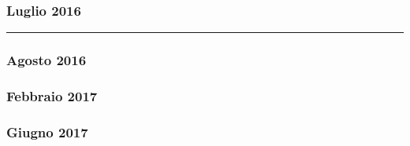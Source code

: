 
\subsubsection*{Luglio 2016}

\begin{mdframed}
	\begin{mdframed}
		
	\end{mdframed}

	

	\noindent\hfil\rule{\textwidth}{.4pt}\hfil

	
\end{mdframed}


\subsubsection*{Agosto 2016}

\begin{mdframed}
	\begin{mdframed}
		
	\end{mdframed}

	
\end{mdframed}



\newpage

\subsubsection*{Febbraio 2017}

\begin{mdframed}
	
\end{mdframed}


\subsubsection*{Giugno 2017}

